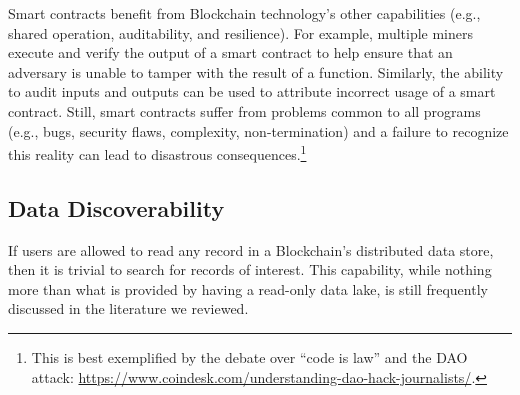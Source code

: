 Smart contracts benefit from Blockchain technology's other capabilities (e.g., shared operation, auditability, and resilience).
For example, multiple miners execute and verify the output of a smart contract to help ensure that an adversary is unable to tamper with the result of a function.
Similarly, the ability to audit inputs and outputs can be used to attribute incorrect usage of a smart contract.
Still, smart contracts suffer from problems common to all programs (e.g., bugs, security flaws, complexity, non-termination) and a failure to recognize this reality can lead to disastrous consequences.\footnote{This is best exemplified by the debate over ``code is law'' and the DAO attack: \url{https://www.coindesk.com/understanding-dao-hack-journalists/}.}

\subsection{Data Discoverability}
If users are allowed to read any record in a Blockchain's distributed data store, then it is trivial to search for records of interest.
This capability, while nothing more than what is provided by having a read-only data lake, is still frequently discussed in the literature we reviewed.